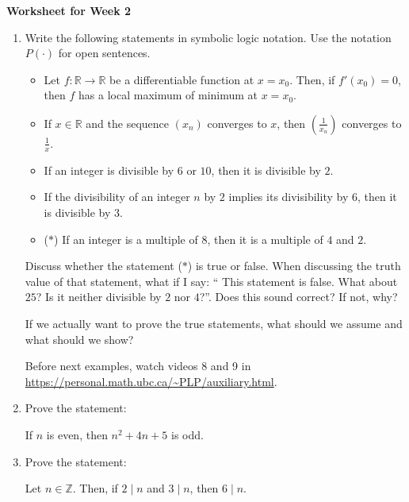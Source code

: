 \documentclass[12pt]{article}
\begin{document}
\centerline{\bf\large Worksheet for Week 2}

\vspace{25pt}


\begin{enumerate}

\item Write the following statements in symbolic logic notation. Use the notation $P(\cdot)$ for open sentences.

\begin{itemize}

\item {\color{red} Let $f:\mathbb R \to \mathbb R$ be a differentiable function at $x=x_0$. Then, if $f'(x_0)=0$, then $f$ has a local maximum of minimum at $x=x_0$}.

\item If $x\in\mathbb R$ and the sequence $(x_n)$ converges to $x$, then $(\frac{1}{x_n})$ converges to $\frac{1}{x}$.

\item {\color{red} If an integer is divisible by $6$ or $10$, then it is divisible by $2$}.

\item If the divisibility of an integer $n$ by $2$ implies its divisibility by $6$, then it is divisible by $3$.

\item {\color{red}($\ast$) If an integer is a multiple of $8$, then it is a multiple of $4$ and $2$}.

\end{itemize}

Discuss whether the statement ($\ast$) is true or false. When discussing the truth value of that statement, what if I say: `` This statement is false. What about $25$? Is it neither divisible by $2$ nor $4$?''. Does this sound correct? If not, why?

 If we actually want to prove the true statements, what should we assume and what should we show?
 
 Before next examples, watch videos 8 and 9 in \url{https://personal.math.ubc.ca/~PLP/auxiliary.html}.

\item  Prove the statement:
\begin{center}
If $n$ is even, then $n^2+4n+5$ is odd.
\end{center}


\item Prove the statement:
\begin{center}
Let $n\in\mathbb Z$. Then, if $2\mid n$ and $3\mid n$, then $6\mid n$.
\end{center}


\end{enumerate}
\end{document}
